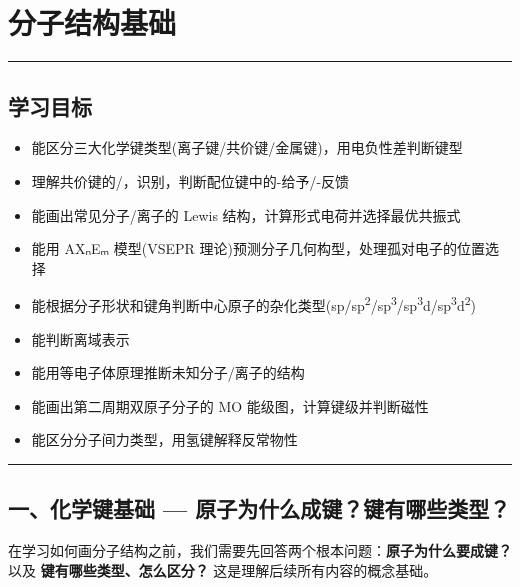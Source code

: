 \section{分子结构基础}\label{ux5206ux5b50ux7ed3ux6784ux57faux7840}

\begin{center}\rule{0.5\linewidth}{0.5pt}\end{center}

\subsection{学习目标}\label{ux5b66ux4e60ux76eeux6807}

\begin{itemize}
\tightlist
\item
  能区分三大化学键类型(离子键/共价键/金属键)，用电负性差判断键型
\item
  理解共价键的/，识别，判断配位键中的-给予/\派-反馈
\item
  能画出常见分子/离子的 Lewis 结构，计算形式电荷并选择最优共振式
\item
  能用 AXₙEₘ 模型(VSEPR 理论)预测分子几何构型，处理孤对电子的位置选择
\item
  能根据分子形状和键角判断中心原子的杂化类型(sp/sp\textsuperscript{2}/sp\textsuperscript{3}/sp\textsuperscript{3}d/sp\textsuperscript{3}d\textsuperscript{2})
\item
  能判断离域  表示
\item
  能用等电子体原理推断未知分子/离子的结构
\item
  能画出第二周期双原子分子的 MO 能级图，计算键级并判断磁性
\item
  能区分分子间力类型，用氢键解释反常物性
\end{itemize}

\begin{center}\rule{0.5\linewidth}{0.5pt}\end{center}

\subsection{一、化学键基础 --- 原子为什么成键？键有哪些类型？}\label{ux4e00ux5316ux5b66ux952eux57faux7840-ux539fux5b50ux4e3aux4ec0ux4e48ux6210ux952eux952eux6709ux54eaux4e9bux7c7bux578b}

在学习如何画分子结构之前，我们需要先回答两个根本问题：\textbf{原子为什么要成键？} 以及 \textbf{键有哪些类型、怎么区分？} 这是理解后续所有内容的概念基础。

